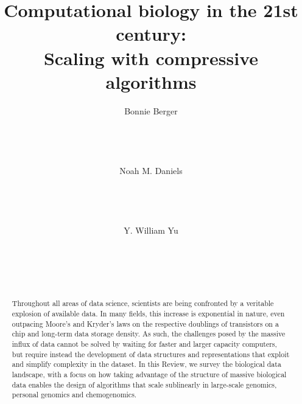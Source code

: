 \documentclass{acm_proc_article-sp}
\begin{document}
\title{Computational biology in the 21st century:\\Scaling with compressive algorithms}

\author{
\alignauthor
Bonnie Berger\\
       \\
       \\
       \\
       \\
\alignauthor
Noah M. Daniels\\
       \\
       \\
       \\
       \\
\alignauthor
Y. William Yu\\
       \\
       \\
       \\
       \\
}

\maketitle
\begin{abstract}
Throughout all areas of data science, scientists are being confronted by a
veritable explosion of available data. In many fields, this increase is
exponential in nature, even outpacing Moore's and Kryder's laws on the
respective doublings of transistors on a chip and long-term data storage
density. As such, the challenges posed by the massive influx of data cannot
be solved by waiting for faster and larger capacity computers, but require
instead the development of data structures and representations that exploit
and simplify complexity in the dataset. In this Review, we
survey the biological data landscape, with a focus on how taking advantage
of the structure of massive biological data enables the design of algorithms
that scale sublinearly in large-scale genomics, personal genomics and
chemogenomics.
\end{abstract}
\end{document}
